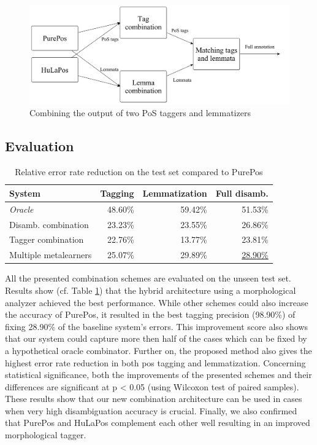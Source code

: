 \begin{figure}[H]
  \centering
  \includegraphics[scale=0.2]{MorphTagging/comb3.png} 
  \caption{Combining the output of two PoS taggers and lemmatizers}
  \label{fig:comb3}
\end{figure}

\subsection{Evaluation}


\begin{table}[H]
\centering
\caption{Relative error rate reduction on the test set compared to PurePos}\label{tab:comb-eval}
\begin{tabular}{l r r r}
\hline
System & Tagging & Lemmatization & Full disamb. \\
\hline
\textit{Oracle} & 48.60\% & 59.42\% & 51.53\% \\
Disamb. combination & 23.23\% & 23.55\% & 26.86\% \\
Tagger combination & 22.76\% & 13.77\% & 23.81\% \\
Multiple metalearners & 25.07\% & 29.89\% & \underline{28.90\%} \\
\hline
\end{tabular}
\end{table}

All the presented combination schemes are evaluated on the unseen test set. %
Results show (cf. Table \ref{tab:comb-eval}) that the hybrid architecture using a morphological analyzer achieved the best performance.
While other schemes could also increase the accuracy of PurePos, it resulted in the best tagging precision (98.90\%) of fixing 28.90\% of the baseline system's errors.
This improvement score also shows that our system could capture more then half of the cases which can be fixed by a hypothetical oracle combinator.
Further on, the proposed method also gives the highest error rate reduction in both \acrshort{pos} tagging and lemmatization.
Concerning statistical significance, both the improvements of the presented schemes and their differences are significant at p < 0.05 (using Wilcoxon test of paired samples).
These results show that our new combination architecture can be used in cases when very high disambiguation accuracy is crucial.
Finally, we also confirmed that PurePos and HuLaPos complement each other well resulting in an improved morphological tagger. 



 

 

 

 
